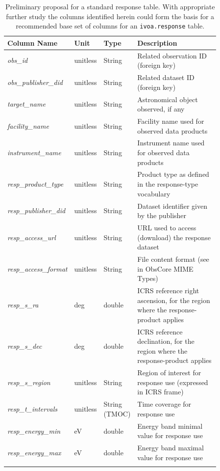 {\small
 \begin{longtable}{|m{0.25\linewidth}|m{0.1\linewidth}|m{0.10\linewidth}|m{0.41\linewidth}|}
\hline
{\bf Column Name} & {\bf Unit} & {\bf Type} & {\bf Description}\\\hline
{\em obs\_id} & unitless & String & Related observation ID (foreign key) \\\hline
{\em obs\_publisher\_did} & unitless & String & Related dataset ID (foreign key) \\\hline
{\em target\_name} & unitless & String & Astronomical object observed, if any\\\hline
{\em facility\_name} & unitless & String & Facility name used for observed data products \\\hline
{\em instrument\_name} & unitless & String & Instrument name used for observed data products \\\hline
{\em resp\_product\_type} & unitless & String &  Product type as defined in the response-type vocabulary\\\hline
{\em resp\_publisher\_did} & unitless & String & Dataset identifier given by the publisher\\\hline
{\em resp\_access\_url} & unitless & String & URL used to access (download) the response dataset\\\hline
{\em resp\_access\_format} & unitless & String & File content format (see in Obs\-Core MIME Types)\\\hline
{\em resp\_s\_ra} & deg & double &  ICRS reference right ascension, for the region where the response-product applies \\\hline
{\em resp\_s\_dec} & deg & double & ICRS reference declination, for the region where the response-product applies\\\hline
{\em resp\_s\_region} & unitless & String & Region of interest for response use (expressed in ICRS frame)\\\hline
{\em resp\_t\_intervals} & unitless& String (TMOC) & Time coverage for response use \\\hline
{\em resp\_energy\_min} & eV & double & Energy band minimal value for response use  \\\hline
{\em resp\_energy\_max} & eV & double & Energy band maximal value for response use  \\\hline

\caption{Preliminary proposal for a standard response table. With appropriate further study the columns identified herein could form the basis for a recommended base set of columns for an  {\tt ivoa.response} table.}
\label{tab:response_table}
\end{longtable}
}

